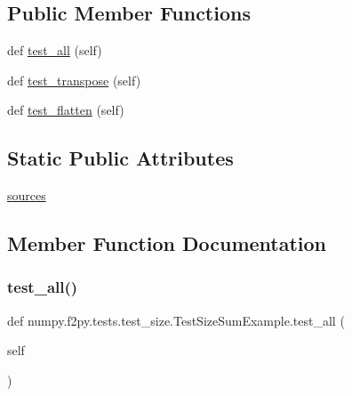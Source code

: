 \subsection*{Public Member Functions}
\begin{DoxyCompactItemize}
\item 
def \hyperlink{classnumpy_1_1f2py_1_1tests_1_1test__size_1_1TestSizeSumExample_a363643869cb41f7f7f2772953c0d4a4d}{test\+\_\+all} (self)
\item 
def \hyperlink{classnumpy_1_1f2py_1_1tests_1_1test__size_1_1TestSizeSumExample_a28232812d54f1fe548d532f9ba199614}{test\+\_\+transpose} (self)
\item 
def \hyperlink{classnumpy_1_1f2py_1_1tests_1_1test__size_1_1TestSizeSumExample_a20f2fae17daf874d51b7676789c1905d}{test\+\_\+flatten} (self)
\end{DoxyCompactItemize}
\subsection*{Static Public Attributes}
\begin{DoxyCompactItemize}
\item 
\hyperlink{classnumpy_1_1f2py_1_1tests_1_1test__size_1_1TestSizeSumExample_a813156220648d0307d81fe7593432f1d}{sources}
\end{DoxyCompactItemize}


\subsection{Member Function Documentation}
\mbox{\label{classnumpy_1_1f2py_1_1tests_1_1test__size_1_1TestSizeSumExample_a363643869cb41f7f7f2772953c0d4a4d}} 
\subsubsection{\texorpdfstring{test\+\_\+all()}{test\_all()}}
{\footnotesize\ttfamily def numpy.\+f2py.\+tests.\+test\+\_\+size.\+Test\+Size\+Sum\+Example.\+test\+\_\+all (\begin{DoxyParamCaption}\item[{}]{self }\end{DoxyParamCaption})}

